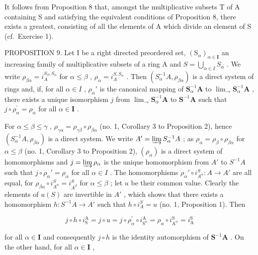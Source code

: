 It follows from Proposition 8 that, amongst the multiplicative subsets T of A containing S and satisfying the equivalent conditions of Proposition 8, there exists a greatest, consisting of all the elements of A which divide an element of S (cf.~Exercise 1).

PROPOSITION 9. Let I be a right directed preordered set, \((\mathrm{S}_{\alpha})_{\alpha \in \mathbf{I}}\) an increasing family of multiplicative subsets of a ring A and \(S = \bigcup_{\alpha \in I} S_{\alpha}\) . We write \(\rho_{\beta \alpha} = i_{A}^{S_{\beta}, S_{\alpha}}\) for \(\alpha \leqslant \beta\) , \(\rho_{\alpha} = i_{A}^{S, S_{\alpha}}\) . Then \((S_{\alpha}^{-1}A, \rho_{\beta \alpha})\) is a direct system of rings and, if, for all \(\alpha \in I\) , \(\rho_{\alpha}'\) is the canonical mapping of \(\mathbf{S}_{\alpha}^{-1}\mathbf{A}\) to \(\lim_{\longrightarrow}\mathbf{S}_{\alpha}^{-1}\mathbf{A}\) , there exists a unique isomorphism \(j\) from \(\lim_{\longrightarrow}\mathbf{S}_{\alpha}^{-1}\mathbf{A}\) to \(\mathbf{S}^{-1}\mathbf{A}\) such that \(j\circ \rho_{\alpha}^{\prime} = \rho_{\alpha}\) for all \(\alpha \in \mathbf{I}\) .

For \(\alpha \leqslant \beta \leqslant \gamma\) , \(\rho_{\gamma \alpha} = \rho_{\gamma \beta} \circ \rho_{\beta \alpha}\) (no. 1, Corollary 3 to Proposition 2), hence \((S_{\alpha}^{-1}A, \rho_{\beta \alpha})\) is a direct system. We write \(A' = \varinjlim S_{\alpha}^{-1}A\) ; as \(\rho_{\alpha} = \rho_{\beta} \circ \rho_{\beta \alpha}\) for \(\alpha \leqslant \beta\) (no. 1, Corollary 3 to Proposition 2), \((\rho_{\alpha})\) is a direct system of homomorphisms and \(j = \varinjlim \rho_{\alpha}\) is the unique homomorphism from \(A'\) to \(S^{-1}A\) such that \(j \circ \rho_{\alpha}' = \rho_{\alpha}\) for all \(\alpha \in I\) . The homomorphisms \(\rho_{\alpha}' \circ i_{A^{\alpha}}^{S}: A \to A'\) are all equal, for \(\rho_{\beta \alpha} \circ i_{A^{\alpha}}^{S} = i_{A^{\beta}}^{S}\) for \(\alpha \leqslant \beta\) ; let \(u\) be their common value. Clearly the elements of \(u(S)\) are invertible in \(A'\) , which shows that there exists a homomorphism \(h: S^{-1}A \to A'\) such that \(h \circ i_{A}^{S} = u\) (no. 1, Proposition 1). Then

\[
j \circ h \circ i _ {\mathrm{S}} ^ {\mathrm{A}} = j \circ u = j \circ \rho_ {\alpha} ^ {\prime} \circ i _ {\mathrm{S} ^ {\alpha}} ^ {\mathrm{A}} = \rho_ {\alpha} \circ i _ {\mathrm{A} ^ {\alpha}} ^ {\mathrm{S}} = i _ {\mathrm{A}} ^ {\mathrm{S}}
\]

for all \(\alpha \in \mathbf{I}\) and consequently \(j \circ h\) is the identity automorphism of \(\mathbf{S}^{-1}\mathbf{A}\) . On the other hand, for all \(\alpha \in \mathbf{I}\) ,

